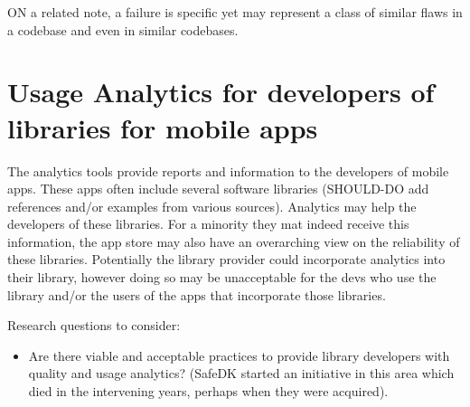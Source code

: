 ON a related note, a failure is specific yet may represent a class of similar flaws in a codebase and even in similar codebases. 


\section{Usage Analytics for developers of libraries for mobile apps}
The analytics tools provide reports and information to the developers of mobile apps. These apps often include several software libraries (SHOULD-DO add references and/or examples from various sources). Analytics may help the developers of these libraries. For a minority they mat indeed receive this information, the app store may also have an overarching view on the reliability of these libraries. Potentially the library provider could incorporate analytics into their library, however doing so may be unacceptable for the devs who use the library and/or the users of the apps that incorporate those libraries.

Research questions to consider:
\begin{itemize}
    \item Are there viable and acceptable practices to provide library developers with quality and usage analytics? (SafeDK started an initiative in this area which died in the intervening years, perhaps when they were acquired).
\end{itemize}

